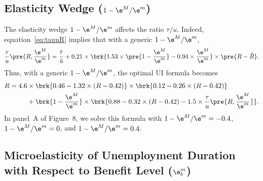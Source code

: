 \documentclass[letterpaper,12pt,leqno]{article}
\begin{document}
\subsection{Elasticity Wedge ($1-\e^{M}/\e^{m}$)}

The elasticity wedge $1-\e^{M}/\e^{m}$ affects the ratio $\tau/u$. Indeed, equation~\eqref{eq:tauuR} implies that with a generic $1-\e^{M}/\e^{m}$,
\begin{equation*}
\frac{\tau}{u}\pre{R,\frac{\e^M}{\e^m}} =\frac{\hat{\tau}}{\hat{u}} + 0.21 \times \brk{1.53\times \pre{1-\frac{\e^M}{\e^m}} -0.94\times \frac{\e^M}{\e^m}}\times \pre{R-\hat{R}}.
\end{equation*}
Thus, with a generic $1-\e^{M}/\e^{m}$, the optimal UI formula becomes
 \begin{align*}
R = 4.6  & \times \brk{0.46-1.32\times (R-0.42)} \times \brk{0.12-0.26\times (R-0.42)}\\
&+\brk{1-\frac{\e^{M}}{\e^{m}}}\times \brk{0.88 - 0.32\times (R-0.42) - 1.5 \times \frac{\tau}{u}\pre{R,\frac{\e^M}{\e^m}}}.
\end{align*}
In panel~A of Figure~8, we solve this formula with $1-\e^{M}/\e^{m}=-0.4$, $1-\e^{M}/\e^{m}=0$, and $1-\e^{M}/\e^{m}=0.4$.

\subsection[Microelasticity of Unemployment Duration with Respect to Benefit Level ($\e^m_b$)]{\hspace*{-0.7cm}Microelasticity of Unemployment Duration with Respect to Benefit Level ($\e^m_b$)}
\end{document}
